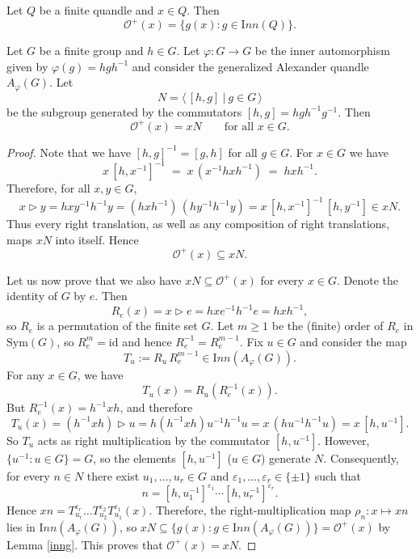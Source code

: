 \documentclass[10pt,a4paper]{amsart}
\newcommand{\Inn}{{\mathrm Inn}}
\begin{document}
\begin{Lemma}
\label{inng}
Let $Q$ be a finite quandle and $x \in Q$. Then
\[
\mathcal O^+(x)=\{g(x) : g \in \Inn(Q)\}.
\]
\end{Lemma}

\begin{Theorem}
\label{orbits}
Let $G$ be a finite group and $h\in G$. Let $\varphi:G\to G$ be the inner automorphism given by
$\varphi(g)=hgh^{-1}$ and consider the generalized Alexander quandle $A_\varphi(G)$.
Let
\[
N=\Big\langle\,[h,g]\ \Big|\ g\in G\,\Big\rangle
\]
be the subgroup generated by the commutators
$[h,g]=hgh^{-1}g^{-1}$.
Then 
\[
\mathcal O^{+}(x)=xN \qquad \text{for all } x\in G.
\]
\end{Theorem}

\begin{proof}
Note that we have $[h,g]^{-1}=[g,h]$ for all $g\in G$.
For $x\in G$ we have
\[
x\,[h,x^{-1}]^{-1} \;=\; x\,(x^{-1}hx h^{-1}) \;=\; hxh^{-1}.
\]
Therefore, for all $x,y\in G$,
\[
x\rhd y
= hxy^{-1}h^{-1}y
= (hxh^{-1})\,(hy^{-1}h^{-1}y)
= x\,[h,x^{-1}]^{-1}\,[h,y^{-1}] \in xN.
\]
Thus every right translation, as well as any composition of right translations, maps $xN$ into itself.  Hence
\[
\mathcal O^{+}(x) \subseteq xN.
\]

Let us now prove that we also have  $xN \subseteq \mathcal O^{+}(x)$ for every $x \in G$.
Denote the identity of $G$ by $e$. Then
\[
R_e(x)=x\rhd e=hxe^{-1}h^{-1}e=hxh^{-1},
\]
so $R_e$ is a permutation of the finite set $G$. Let $m\ge 1$ be the (finite) order of $R_e$ in
$\mathrm{Sym}(G)$, so $R_e^m=\mathrm{id}$ and hence $R_e^{-1}=R_e^{m-1}$.
Fix $u\in G$ and consider the map
\[
T_u := R_u\,R_e^{m-1} \in \Inn(A_\varphi(G)).
\]
For any $x\in G$, we have
\[
T_u(x)=R_u(R_e^{-1}(x)).
\]
But $R_e^{-1}(x)=h^{-1}xh$, and therefore
\[
T_u(x)
= (h^{-1}xh)\rhd u
= h(h^{-1}xh)u^{-1}h^{-1}u
= x\,(hu^{-1}h^{-1}u)
= x\,[h,u^{-1}].
\]
So $T_u$ acts as right multiplication by the commutator $[h,u^{-1}]$.
However, $\{u^{-1} : u\in G\}=G$, so the elements $[h,u^{-1}]$
($u\in G$) generate $N$. Consequently, for every $n\in N$ there exist $u_1,\dots,u_r\in G$ and
$\varepsilon_1,\dots,\varepsilon_r\in\{\pm1\}$ such that
\[
n=[h,u_1^{-1}]^{\varepsilon_1}\cdots [h,u_r^{-1}]^{\varepsilon_r}.
\]
Hence $xn=T_{u_r}^{\varepsilon_r}\ldots T_{u_2}^{\varepsilon_2}T_{u_1}^{\varepsilon_1}(x)$. 
Therefore, the right-multiplication map $\rho_n:x\mapsto xn$ lies in $\Inn(A_{\varphi}(G))$, so
$xN \subseteq \{g(x) : g \in \Inn(A_{\varphi}(G))\}=\mathcal O^+(x)$ by Lemma \ref{inng}.
This proves that $\mathcal O^{+}(x)=xN$.
\end{proof}
\end{document}
